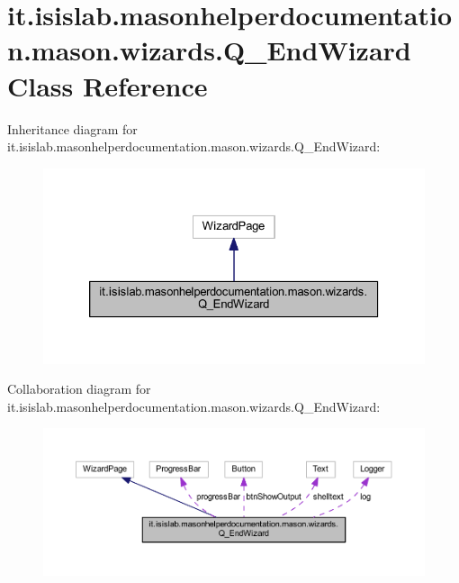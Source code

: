 \hypertarget{classit_1_1isislab_1_1masonhelperdocumentation_1_1mason_1_1wizards_1_1_q___end_wizard}{\section{it.\-isislab.\-masonhelperdocumentation.\-mason.\-wizards.\-Q\-\_\-\-End\-Wizard Class Reference}
\label{classit_1_1isislab_1_1masonhelperdocumentation_1_1mason_1_1wizards_1_1_q___end_wizard}
}


Inheritance diagram for it.\-isislab.\-masonhelperdocumentation.\-mason.\-wizards.\-Q\-\_\-\-End\-Wizard\-:
\nopagebreak
\begin{figure}[H]
\begin{center}
\leavevmode
\includegraphics[width=326pt]{classit_1_1isislab_1_1masonhelperdocumentation_1_1mason_1_1wizards_1_1_q___end_wizard__inherit__graph}
\end{center}
\end{figure}


Collaboration diagram for it.\-isislab.\-masonhelperdocumentation.\-mason.\-wizards.\-Q\-\_\-\-End\-Wizard\-:
\nopagebreak
\begin{figure}[H]
\begin{center}
\leavevmode
\includegraphics[width=350pt]{classit_1_1isislab_1_1masonhelperdocumentation_1_1mason_1_1wizards_1_1_q___end_wizard__coll__graph}
\end{center}
\end{figure}
